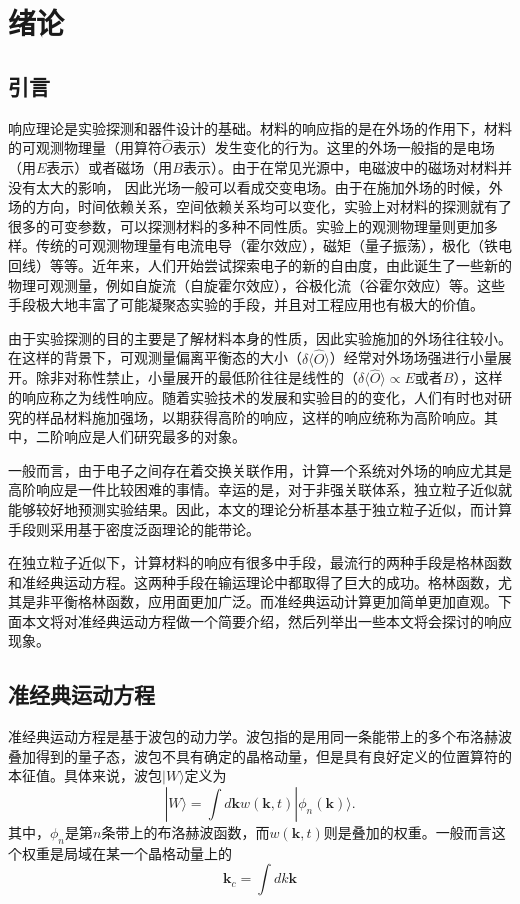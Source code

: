 \chapter{绪论}
\label{cha:intro}

\section{引言}

响应理论是实验探测和器件设计的基础。材料的响应指的是在外场的作用下，材料的可观测物理量（用算符$\hat{O}$表示）发生变化的行为。这里的外场一般指的是电场（用$E$表示）或者磁场（用$B$表示）。由于在常见光源中，电磁波中的磁场对材料并没有太大的影响， 因此光场一般可以看成交变电场。由于在施加外场的时候，外场的方向，时间依赖关系，空间依赖关系均可以变化，实验上对材料的探测就有了很多的可变参数，可以探测材料的多种不同性质。实验上的观测物理量则更加多样。传统的可观测物理量有电流电导（霍尔效应），磁矩（量子振荡），极化（铁电回线）等等。近年来，人们开始尝试探索电子的新的自由度，由此诞生了一些新的物理可观测量，例如自旋流（自旋霍尔效应），谷极化流（谷霍尔效应）等。这些手段极大地丰富了可能凝聚态实验的手段，并且对工程应用也有极大的价值。


由于实验探测的目的主要是了解材料本身的性质，因此实验施加的外场往往较小。在这样的背景下，可观测量偏离平衡态的大小（$\delta\langle\hat{O}\rangle$）经常对外场场强进行小量展开。除非对称性禁止，小量展开的最低阶往往是线性的（$\delta\langle\hat{O}\rangle \propto E$或者$B$），这样的响应称之为线性响应。随着实验技术的发展和实验目的的变化，人们有时也对研究的样品材料施加强场，以期获得高阶的响应，这样的响应统称为高阶响应。其中，二阶响应是人们研究最多的对象。

一般而言，由于电子之间存在着交换关联作用，计算一个系统对外场的响应尤其是高阶响应是一件比较困难的事情。幸运的是，对于非强关联体系，独立粒子近似就能够较好地预测实验结果。因此，本文的理论分析基本基于独立粒子近似，而计算手段则采用基于密度泛函理论的能带论。

在独立粒子近似下，计算材料的响应有很多中手段，最流行的两种手段是格林函数和准经典运动方程。这两种手段在输运理论中都取得了巨大的成功。格林函数，尤其是非平衡格林函数，应用面更加广泛。而准经典运动计算更加简单更加直观。下面本文将对准经典运动方程做一个简要介绍，然后列举出一些本文将会探讨的响应现象。

\section{准经典运动方程}

准经典运动方程是基于波包的动力学。波包指的是用同一条能带上的多个布洛赫波叠加得到的量子态，波包不具有确定的晶格动量，但是具有良好定义的位置算符的本征值。具体来说，波包$|W\rangle$定义为
\begin{equation}
|W\rangle=\int d\boldsymbol{k} w(\boldsymbol{k}, t)|\phi_n(\boldsymbol{k})\rangle.
\end{equation}
其中，$\phi_n$是第$n$条带上的布洛赫波函数，而$w(\boldsymbol{k},t)$则是叠加的权重。一般而言这个权重是局域在某一个晶格动量上的
\begin{equation}
\boldsymbol{k}_c = \int dk \boldsymbol{k}
\end{equation}

